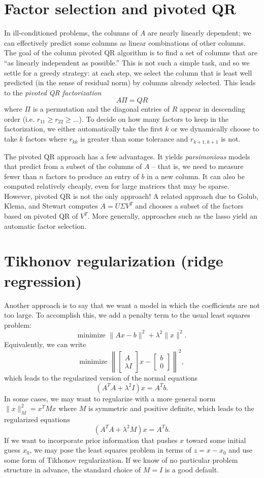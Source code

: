 \documentclass[12pt, leqno]{article} %
\begin{document}
\section{Factor selection and pivoted QR}

In ill-conditioned problems, the columns of $A$ are nearly linearly
dependent; we can effectively predict some columns as linear
combinations of other columns.  The goal of the column pivoted QR
algorithm is to find a set of columns that are ``as linearly
independent as possible.''  This is not such a simple task,
and so we settle for a greedy strategy: at each step, we select the
column that is least well predicted (in the sense of residual norm)
by columns already selected.  This leads to the {\em pivoted QR
  factorization}
\[
  A \Pi = Q R
\]
where $\Pi$ is a permutation and the diagonal entries of $R$ appear
in descending order (i.e. $r_{11} \geq r_{22} \geq \ldots$).  To
decide on how many factors to keep in the factorization, we either
automatically take the first $k$ or we dynamically choose to take $k$
factors where $r_{kk}$ is greater than some tolerance and
$r_{k+1,k+1}$ is not.

The pivoted QR approach has a few advantages.  It yields {\em
  parsimonious} models that predict from a subset of the columns of
$A$ -- that is, we need to measure fewer than $n$ factors to produce
an entry of $b$ in a new column.  It can also be computed relatively
cheaply, even for large matrices that may be sparse.
However, pivoted QR is not the only approach!  A related approach
due to Golub, Klema, and Stewart computes $A = U \Sigma V^T$ and
chooses a subset of the factors based on pivoted QR of $V^T$.
More generally, approaches such as the lasso yield an automatic
factor selection.

\section{Tikhonov regularization (ridge regression)}

Another approach is to say that we want a model in which the
coefficients are not too large.  To accomplish this, we add
a penalty term to the usual least squares problem:
\[
  \mbox{minimize } \|Ax-b\|^2 + \lambda^2 \|x\|^2.
\]
Equivalently, we can write
\[
\mbox{minimize } \left\|
\begin{bmatrix} A \\ \lambda I \end{bmatrix} x -
\begin{bmatrix} b \\ 0 \end{bmatrix}
\right\|^2,
\]
which leads to the regularized version of the normal equations
\[
  (A^T A + \lambda^2 I) x = A^T b.
\]
In some cases, we may want to regularize with a more general
norm $\|x\|_M^2 = x^T M x$ where $M$ is symmetric and positive
definite, which leads to the regularized equations
\[
  (A^T A + \lambda^2 M) x = A^T b.
\]
If we want to incorporate prior information that pushes $x$
toward some initial guess $x_0$, we may pose the least squares
problem in terms of $z = x-x_0$ and use some form of Tikhonov
regularization.  If we know of no particular problem structure
in advance, the standard choice of $M = I$ is a good default.
\end{document}

